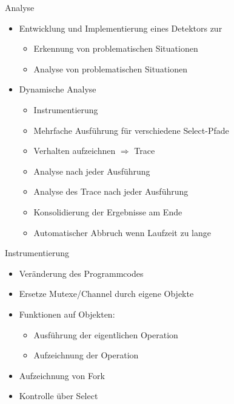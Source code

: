 \documentclass[aspectratio=169]{beamer}  %
\begin{document}
\begin{frame}{Analyse}
  \begin{itemize}
    \item Entwicklung und Implementierung eines Detektors zur
    \begin{itemize}
      \item Erkennung von problematischen Situationen
      \item Analyse von problematischen Situationen 
    \end{itemize}
    \item<2> Dynamische Analyse
    \begin{itemize}
      \item<2> Instrumentierung
      \item<2> Mehrfache Ausführung für verschiedene Select-Pfade
      \item<2> Verhalten aufzeichnen $\Rightarrow$ Trace
      \item<2> Analyse nach jeder Ausführung
      \item<2> Analyse des Trace nach jeder Ausführung
      \item<2> Konsolidierung der Ergebnisse am Ende
      \item<2> Automatischer Abbruch wenn Laufzeit zu lange
    \end{itemize}
  \end{itemize}  
\end{frame}





\begin{frame}{Instrumentierung}
  \begin{itemize}
    \item Veränderung des Programmcodes
    \item Ersetze Mutexe/Channel durch eigene Objekte
    \item Funktionen auf Objekten:
    \begin{itemize}
      \item Ausführung der eigentlichen Operation
      \item Aufzeichnung der Operation
    \end{itemize}
    \item Aufzeichnung von Fork
    \item Kontrolle über Select
  \end{itemize}
\end{frame}
\end{document}
